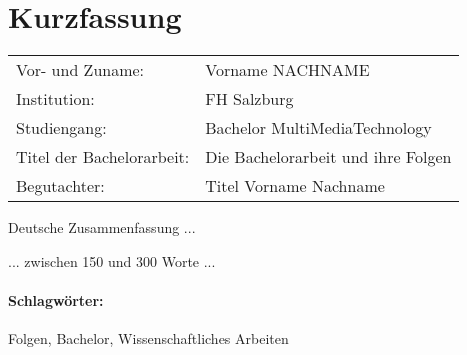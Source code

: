 \section*{Kurzfassung}
\begin{tabular}{l l}
Vor- und Zuname:& Vorname NACHNAME\\
Institution: & FH Salzburg\\ 
Studiengang: &  Bachelor MultiMediaTechnology\\ 
Titel der Bachelorarbeit: & Die Bachelorarbeit und ihre Folgen\\
Begutachter: & Titel Vorname Nachname\\ 
\end{tabular} 
\vspace{0.5cm}

Deutsche Zusammenfassung ...

... zwischen 150 und 300 Worte ...

\paragraph{Schlagwörter:}
Folgen, Bachelor, Wissenschaftliches Arbeiten
